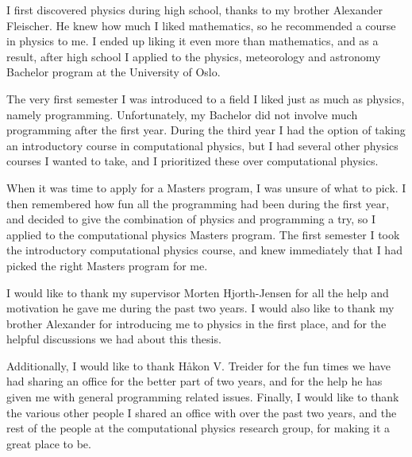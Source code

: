 \documentclass[../main.tex]{subfiles}
\begin{document}
I first discovered physics during high school, thanks to my brother Alexander Fleischer. He knew how much I liked mathematics, so he recommended a course in physics to me. I ended up liking it even more than mathematics, and as a result, after high school I applied to the physics, meteorology and astronomy Bachelor program at the University of Oslo.

The very first semester I was introduced to a field I liked just as much as physics, namely programming. Unfortunately, my Bachelor did not involve much programming after the first year. During the third year I had the option of taking an introductory course in computational physics, but I had several other physics courses I wanted to take, and I prioritized these over computational physics.

When it was time to apply for a Masters program, I was unsure of what to pick. I then remembered how fun all the programming had been during the first year, and decided to give the combination of physics and programming a try, so I applied to the computational physics Masters program. The first semester I took the introductory computational physics course, and knew immediately that I had picked the right Masters program for me.

I would like to thank my supervisor Morten Hjorth-Jensen for all the help and motivation he gave me during the past two years. I would also like to thank my brother Alexander for introducing me to physics in the first place, and for the helpful discussions we had about this thesis. 

Additionally, I would like to thank Håkon V. Treider for the fun times we have had sharing an office for the better part of two years, and for the help he has given me with general programming related issues. Finally, I would like to thank the various other people I shared an office with over the past two years, and the rest of the people at the computational physics research group, for making it a great place to be.

{\raggedleft\vfill\itshape{}\par
}
\end{document}
